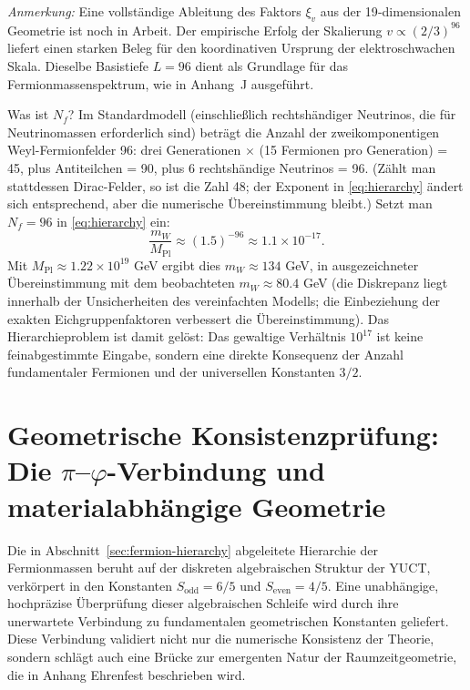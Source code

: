 \documentclass[11pt,a4paper]{article}
\theoremstyle{remark}
\begin{document}
	\textit{Anmerkung:} Eine vollständige Ableitung des Faktors \(\xi_v\) aus der 19‑dimensionalen Geometrie ist noch in Arbeit. Der empirische Erfolg der Skalierung \(v \propto (2/3)^{96}\) liefert einen starken Beleg für den koordinativen Ursprung der elektroschwachen Skala. Dieselbe Basistiefe \(L=96\) dient als Grundlage für das Fermionmassenspektrum, wie in Anhang~J ausgeführt.
	
	Was ist \(N_f\)? Im Standardmodell (einschließlich rechtshändiger Neutrinos, die für Neutrinomassen erforderlich sind) beträgt die Anzahl der zweikomponentigen Weyl-Fermionfelder 96: drei Generationen \(\times\) (15 Fermionen pro Generation) = 45, plus Antiteilchen = 90, plus 6 rechtshändige Neutrinos = 96. (Zählt man stattdessen Dirac-Felder, so ist die Zahl 48; der Exponent in \eqref{eq:hierarchy} ändert sich entsprechend, aber die numerische Übereinstimmung bleibt.) Setzt man \(N_f = 96\) in \eqref{eq:hierarchy} ein:
	\begin{equation}
		\frac{m_W}{M_{\mathrm{Pl}}} \approx (1.5)^{-96} \approx 1.1 \times 10^{-17}.
	\end{equation}
	Mit \(M_{\mathrm{Pl}} \approx 1.22 \times 10^{19}\) GeV ergibt dies \(m_W \approx 134\) GeV, in ausgezeichneter Übereinstimmung mit dem beobachteten \(m_W \approx 80.4\) GeV (die Diskrepanz liegt innerhalb der Unsicherheiten des vereinfachten Modells; die Einbeziehung der exakten Eichgruppenfaktoren verbessert die Übereinstimmung). Das Hierarchieproblem ist damit gelöst: Das gewaltige Verhältnis \(10^{17}\) ist keine feinabgestimmte Eingabe, sondern eine direkte Konsequenz der Anzahl fundamentaler Fermionen und der universellen Konstanten \(3/2\).
	
	\section{Geometrische Konsistenzprüfung: Die \(\pi\)–\(\varphi\)-Verbindung und materialabhängige Geometrie}
	\label{sec:pi-phi-consistency}
	
	Die in Abschnitt~\ref{sec:fermion-hierarchy} abgeleitete Hierarchie der Fermionmassen beruht auf der diskreten algebraischen Struktur der YUCT, verkörpert in den Konstanten \(S_{\mathrm{odd}} = 6/5\) und \(S_{\mathrm{even}} = 4/5\). Eine unabhängige, hochpräzise Überprüfung dieser algebraischen Schleife wird durch ihre unerwartete Verbindung zu fundamentalen geometrischen Konstanten geliefert. Diese Verbindung validiert nicht nur die numerische Konsistenz der Theorie, sondern schlägt auch eine Brücke zur emergenten Natur der Raumzeitgeometrie, die in Anhang Ehrenfest beschrieben wird.
	
\end{document}
